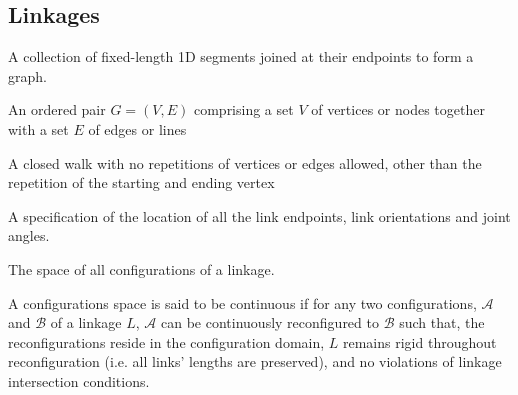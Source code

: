 \subsection{Linkages}
\begin{definition}[Linkage]\label{def:linkages-1}
A collection of fixed-length 1D segments joined at their endpoints to form a graph.
\end{definition} 
\begin{definition}[Graph]\label{def:linkages-2}
An ordered pair $G = (V, E)$ comprising a set $V$ of vertices or nodes together with a set $E$ of edges or lines
\end{definition} 
\begin{definition}[Cycle]\label{def:linkages-3}
 A closed walk with no repetitions of vertices or edges allowed, other than the repetition of the starting and ending vertex
\end{definition} 
\begin{definition}[Configuration]\label{def:linkages-6}
A specification of the location of all the link endpoints, link orientations and
joint angles.\cite{demaine2008geometric}
\end{definition}
\begin{definition}\label{def:linkages-7}
The space of all configurations of a linkage.
\end{definition} 
A configurations space is said to be continuous if for any two configurations, $\mathcal{A}$ and $\mathcal{B}$ of a linkage $L$, $\mathcal{A}$ can be continuously reconfigured to $\mathcal{B}$ such that, the reconfigurations reside in the configuration domain, $L$ remains rigid throughout reconfiguration (i.e. all links' lengths are preserved), and no violations of linkage intersection conditions. 

